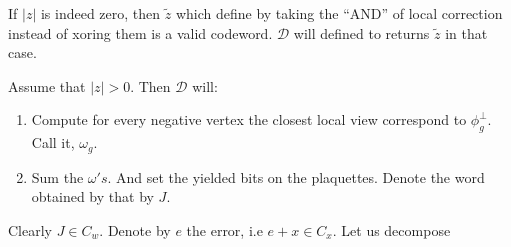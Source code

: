 \documentclass{article}
\begin{document}
\begin{multicols*}{2}
 If $|z|$ is indeed zero, then $\tilde{z}$ which define by taking the ``AND'' of local correction instead of xoring them is a valid codeword. 
 $\mathcal{D}$ will defined to returns $\tilde{z}$ in that case. 

 Assume that $|z| > 0 $. Then $\mathcal{D}$ will:
 \begin{enumerate}
   \item Compute for every negative vertex the closest local view correspond to $\phi_{g}^{\perp}$. Call it, $\omega_{g}$.
   \item Sum the $\omega's$. And set the yielded bits on the plaquettes. Denote the word obtained by that by $J$.


 \end{enumerate}
 Clearly $J \in C_{w}$. Denote by $e$ the error, i.e $e + x \in C_{x}$. Let us decompose  

  

\end{multicols*}
\end{document}

